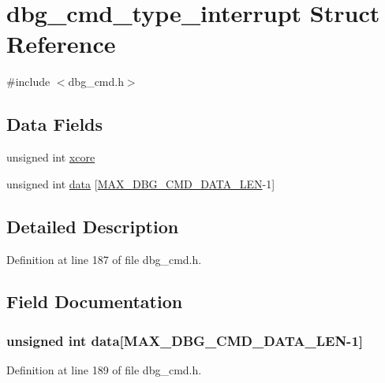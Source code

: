 \hypertarget{structdbg__cmd__type__interrupt}{\section{dbg\-\_\-cmd\-\_\-type\-\_\-interrupt Struct Reference}
\label{structdbg__cmd__type__interrupt}
}


{\ttfamily \#include $<$dbg\-\_\-cmd.\-h$>$}

\subsection*{Data Fields}
\begin{DoxyCompactItemize}
\item 
unsigned int \hyperlink{structdbg__cmd__type__interrupt_a78357326dd562d441c3c73f5676ac638}{xcore}
\item 
unsigned int \hyperlink{structdbg__cmd__type__interrupt_abceed6826af53b88f4cc936fac1716f0}{data} \mbox{[}\hyperlink{dbg__cmd_8h_a4552ec15033c8a68870cdf80eda5470c}{M\-A\-X\-\_\-\-D\-B\-G\-\_\-\-C\-M\-D\-\_\-\-D\-A\-T\-A\-\_\-\-L\-E\-N}-\/1\mbox{]}
\end{DoxyCompactItemize}


\subsection{Detailed Description}


Definition at line 187 of file dbg\-\_\-cmd.\-h.



\subsection{Field Documentation}
\hypertarget{structdbg__cmd__type__interrupt_abceed6826af53b88f4cc936fac1716f0}{
\subsubsection[{data}]{\setlength{\rightskip}{0pt plus 5cm}unsigned int data\mbox{[}{\bf M\-A\-X\-\_\-\-D\-B\-G\-\_\-\-C\-M\-D\-\_\-\-D\-A\-T\-A\-\_\-\-L\-E\-N}-\/1\mbox{]}}}\label{structdbg__cmd__type__interrupt_abceed6826af53b88f4cc936fac1716f0}


Definition at line 189 of file dbg\-\_\-cmd.\-h.

